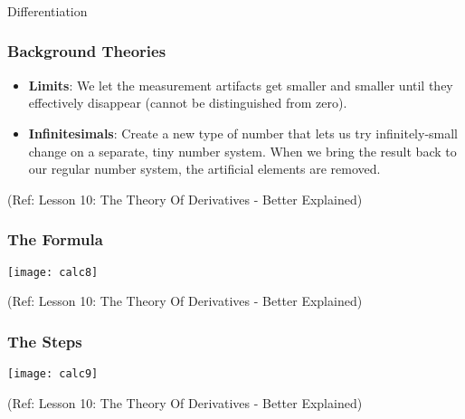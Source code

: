 \newcommand \derv [1] {\frac{d {#1} }{d x}}
\newcommand \dderv [1] {\frac{d^2 {#1} }{d x^2}}

\begin{frame}[fragile]\frametitle{}
\begin{center}
{\Large Differentiation}
\end{center}
\end{frame}

 \begin{frame}[fragile]\frametitle{Background Theories}
 

\begin{itemize}
\item {\bf Limits}: We let the measurement artifacts get smaller and smaller until they effectively disappear (cannot be distinguished from zero).
\item {\bf Infinitesimals}: Create a new type of number that lets us try infinitely-small change on a separate, tiny number system. When we bring the result back to our regular number system, the artificial elements are removed.
\end{itemize}

\tiny{(Ref: Lesson 10: The Theory Of Derivatives - Better Explained)}
\end{frame}

 \begin{frame}[fragile]\frametitle{The Formula}
 

\begin{center}
\texttt{[image: calc8]}
\end{center}

\tiny{(Ref: Lesson 10: The Theory Of Derivatives - Better Explained)}
\end{frame}

 \begin{frame}[fragile]\frametitle{The Steps}
 

\begin{center}
\texttt{[image: calc9]}
\end{center}

\tiny{(Ref: Lesson 10: The Theory Of Derivatives - Better Explained)}
\end{frame}


